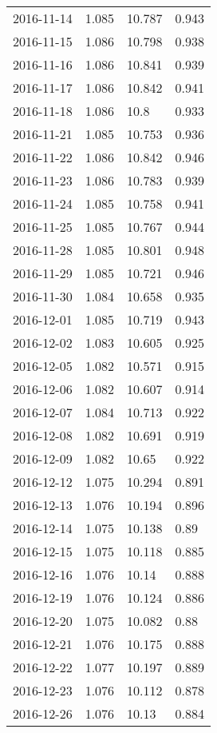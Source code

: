\begin{center}
\begin{longtable}{r lll}
    2016-11-14 & 1.085  & 10.787 & 0.943  \\
    2016-11-15 & 1.086  & 10.798 & 0.938  \\
    2016-11-16 & 1.086  & 10.841 & 0.939  \\
    2016-11-17 & 1.086  & 10.842 & 0.941  \\
    2016-11-18 & 1.086  & 10.8   & 0.933  \\
    2016-11-21 & 1.085  & 10.753 & 0.936  \\
    2016-11-22 & 1.086  & 10.842 & 0.946  \\
    2016-11-23 & 1.086  & 10.783 & 0.939  \\
    2016-11-24 & 1.085  & 10.758 & 0.941  \\
    2016-11-25 & 1.085  & 10.767 & 0.944  \\
    2016-11-28 & 1.085  & 10.801 & 0.948  \\
    2016-11-29 & 1.085  & 10.721 & 0.946  \\
    2016-11-30 & 1.084  & 10.658 & 0.935  \\
    2016-12-01 & 1.085  & 10.719 & 0.943  \\
    2016-12-02 & 1.083  & 10.605 & 0.925  \\
    2016-12-05 & 1.082  & 10.571 & 0.915  \\
    2016-12-06 & 1.082  & 10.607 & 0.914  \\
    2016-12-07 & 1.084  & 10.713 & 0.922  \\
    2016-12-08 & 1.082  & 10.691 & 0.919  \\
    2016-12-09 & 1.082  & 10.65  & 0.922  \\
    2016-12-12 & 1.075  & 10.294 & 0.891  \\
    2016-12-13 & 1.076  & 10.194 & 0.896  \\
    2016-12-14 & 1.075  & 10.138 & 0.89   \\
    2016-12-15 & 1.075  & 10.118 & 0.885  \\
    2016-12-16 & 1.076  & 10.14  & 0.888  \\
    2016-12-19 & 1.076  & 10.124 & 0.886  \\
    2016-12-20 & 1.075  & 10.082 & 0.88   \\
    2016-12-21 & 1.076  & 10.175 & 0.888  \\
    2016-12-22 & 1.077  & 10.197 & 0.889  \\
    2016-12-23 & 1.076  & 10.112 & 0.878  \\
    2016-12-26 & 1.076  & 10.13  & 0.884  \\

\end{longtable}
\end{center}
